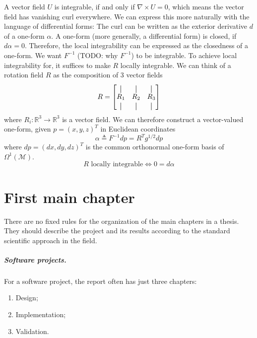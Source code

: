\documentclass[a4paper,twoside,openright,11pt]{report}
\newcommand*{\vertbar}{\rule[-1ex]{0.5pt}{2.5ex}}
\begin{document}
A vector field $U$ is integrable, if and only if $\nabla \times U = 0$,
which means the vector field has vanishing curl everywhere.
We can express this more naturally with the language of differential forms:
The curl can be written as the exterior derivative $d$ of a one-form $\alpha$.
A one-form (more generally, a differential form) is closed, if $d\alpha = 0$.
Therefore, the local integrability can be expressed as the closedness of a one-form.
We want $F^{-1}$ (TODO: why $F^{-1}$) to be integrable.
To achieve local integrability for, it suffices to make $R$ locally integrable.
We can think of a rotation field $R$ as the composition of 3 vector fields
$$R = \begin{bmatrix}
  \vertbar & \vertbar & \vertbar \\
  R_1 & R_2 & R_3 \\
  \vertbar & \vertbar & \vertbar
\end{bmatrix}$$
where $R_i : \mathbb{R}^3 \to \mathbb{R}^3$ is a vector field.
We can therefore construct a vector-valued one-form, given $p=(x,y,z)^T$ in Euclidean coordinates
$$\alpha \triangleq F^{-1}dp = R^Tg^{1/2}dp$$
where $dp = (dx,dy,dz)^T$ is the common orthonormal one-form basis of $\Omega^1(\mathcal{M})$.
$$R \text{ locally integrable} \iff 0 = d\alpha$$




\chapter{First main chapter}

There are no fixed rules for the organization of the main chapters in a
thesis.  They should describe the project and its results according to the
standard scientific approach in the field.

\paragraph{Software projects.}

For a software project, the report often has just three chapters:
\begin{enumerate}
\item Design;
\item Implementation;
\item Validation.
\end{enumerate}
\end{document}

